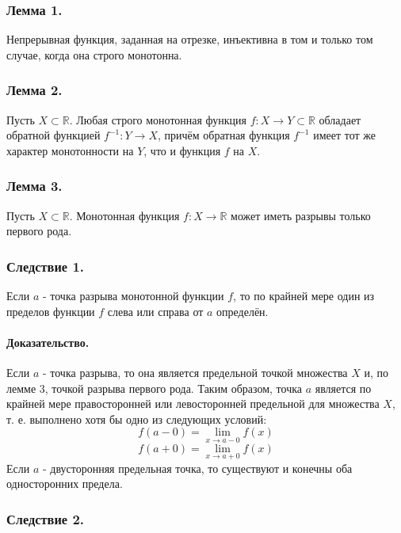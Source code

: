 \subsubsection{Лемма 1.}

Непрерывная функция, заданная на отрезке, инъективна в том и только том случае, когда она строго монотонна.

\subsubsection{Лемма 2.}

Пусть $X \subset \mathbb{R}$.
Любая строго монотонная функция $f:X \to Y \subset \mathbb{R}$ обладает обратной функцией $f^{-1}:Y \to X$,
причём обратная функция $f^{-1}$ имеет тот же характер монотонности на $Y$, что и функция $f$ на $X$.

\subsubsection{Лемма 3.}

Пусть $X \subset \mathbb{R}$.
Монотонная функция $f:X\to \mathbb{R}$ может иметь разрывы только первого рода.

\subsubsection{Следствие 1.}

Если $a$ - точка разрыва монотонной функции $f$, то по крайней мере один из пределов функции $f$ слева или справа от $a$ определён.

\paragraph{Доказательство.}

Если $a$ - точка разрыва, то она является предельной точкой множества $X$ и, по лемме 3, точкой разрыва первого рода.
Таким образом, точка $a$ является по крайней мере правосторонней или левосторонней предельной для множества $X$, т. е. выполнено хотя бы одно из следующих условий:
\[
f(a-0)=\lim_{x \to a-0}f(x)
\]
\[
f(a+0)=\lim_{x \to a+0}f(x)
\]
Если $a$ - двусторонняя предельная точка, то существуют и конечны оба односторонних предела.

\subsubsection{Следствие 2.}

